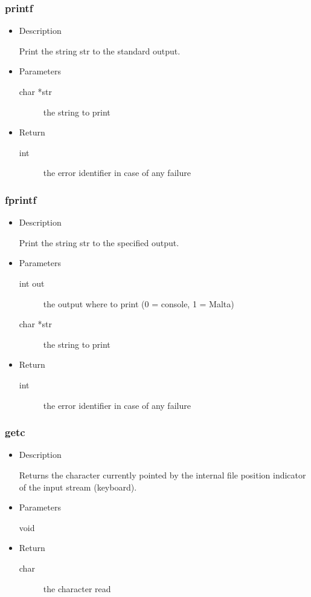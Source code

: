\subsubsection{printf}
\begin{itemize}
\item{Description}

	Print the string str to the standard output.
\item{Parameters}
	\begin{description}
	\item[char *str] the string to print
	\end{description}
\item{Return}
	\begin{description}
	\item[int] the error identifier in case of any failure
	\end{description}
\end{itemize}

\subsubsection{fprintf}
\begin{itemize}
\item{Description}

	Print the string str to the specified output.
\item{Parameters}
	\begin{description}
	\item[int out] the output where to print (0 = console, 1 = Malta)
	\item[char *str] the string to print
	\end{description}
\item{Return}
	\begin{description}
	\item[int] the error identifier in case of any failure
	\end{description}
\end{itemize}

\subsubsection{getc}
\begin{itemize}
\item{Description}

	Returns the character currently pointed by the internal file position indicator of the input stream (keyboard).
\item{Parameters}
	\begin{description}
	\item[void] 
	\end{description}
\item{Return}
	\begin{description}
	\item[char] the character read
	\end{description}
\end{itemize}

